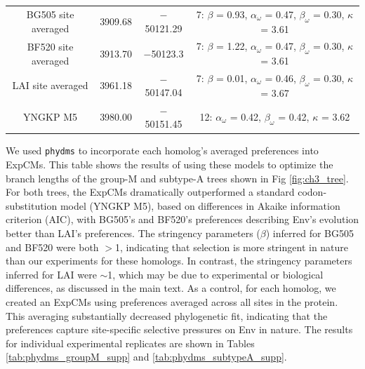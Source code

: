 \documentclass[9pt,lineno]{elife}
\begin{document}
\begin{table}
{\begin{tabular}{cccc}
BG505 site averaged & 3909.68 & $-$50121.29 & 7: $\beta$ = 0.93, $\alpha_\omega$ = 0.47, $\beta_\omega$ = 0.30, $\kappa$ = 3.61\\
BF520 site averaged & 3913.70 & $-$50123.3 & 7: $\beta$ = 1.22, $\alpha_\omega$ = 0.47, $\beta_\omega$ = 0.30, $\kappa$ = 3.61\\
LAI site averaged & 3961.18 & $-$50147.04 & 7: $\beta$ = 0.01, $\alpha_\omega$ = 0.46, $\beta_\omega$ = 0.30, $\kappa$ = 3.67\\
YNGKP M5 & 3980.00 & $-$50151.45 & 12: $\alpha_\omega$ = 0.42, $\beta_\omega$ = 0.42, $\kappa$ = 3.62
\end{tabular}
}
\begin{flushleft}
We used \texttt{phydms} to incorporate each homolog's averaged preferences into ExpCMs.
This table shows the results of using these models to optimize the branch lengths of the group-M and subtype-A trees shown in Fig \ref{fig:ch3_tree}.
For both trees, the ExpCMs dramatically outperformed a standard codon-substitution model (YNGKP M5), based on differences in Akaike information criterion (AIC), with BG505's and BF520's preferences describing Env's evolution better than LAI's preferences. 
The stringency parameters ($\beta$) inferred for BG505 and BF520 were both  $>$1, indicating that selection is more stringent in nature than our experiments for these homologs.
In contrast, the stringency parameters inferred for LAI were $\sim$1, which may be due to experimental or biological differences, as discussed in the main text.
As a control, for each homolog, we created an ExpCMs using preferences averaged across all sites in the protein.
This averaging substantially decreased phylogenetic fit, indicating that the preferences capture site-specific selective pressures on Env in nature.
The results for individual experimental replicates are shown in Tables \ref{tab:phydms_groupM_supp} and \ref{tab:phydms_subtypeA_supp}.
\end{flushleft}
\label{tab:phydms}
\end{table}
\end{document}
